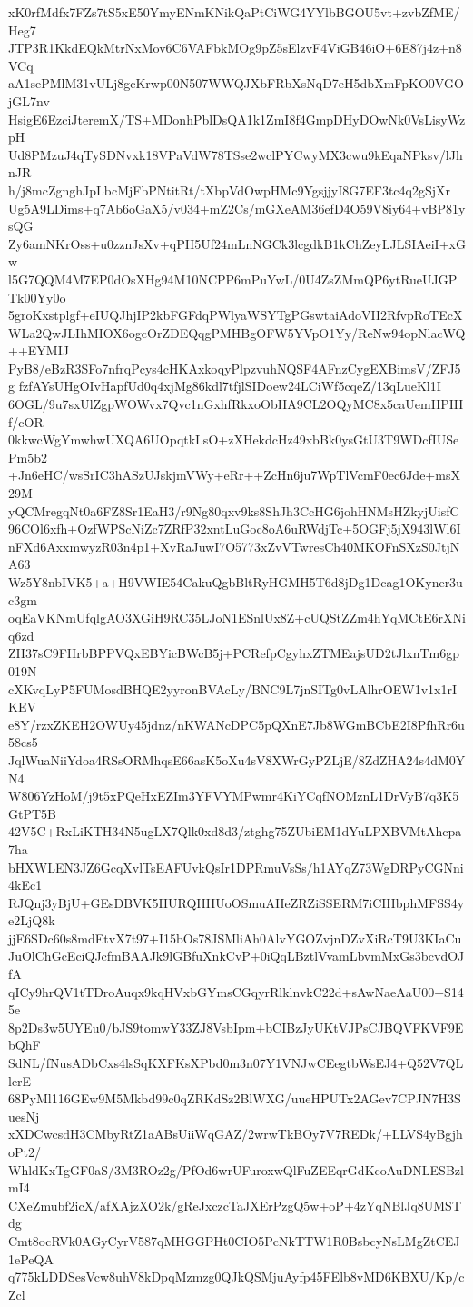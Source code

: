 xK0rfMdfx7FZs7tS5xE50YmyENmKNikQaPtCiWG4YYlbBGOU5vt+zvbZfME/Heg7
JTP3R1KkdEQkMtrNxMov6C6VAFbkMOg9pZ5sElzvF4ViGB46iO+6E87j4z+n8VCq
aA1sePMlM31vULj8gcKrwp00N507WWQJXbFRbXsNqD7eH5dbXmFpKO0VGOjGL7nv
HsigE6EzciJteremX/TS+MDonhPblDsQA1k1ZmI8f4GmpDHyDOwNk0VsLisyWzpH
Ud8PMzuJ4qTySDNvxk18VPaVdW78TSse2wclPYCwyMX3cwu9kEqaNPksv/lJhnJR
h/j8mcZgnghJpLbcMjFbPNtitRt/tXbpVdOwpHMc9YgsjjyI8G7EF3tc4q2gSjXr
Ug5A9LDims+q7Ab6oGaX5/v034+mZ2Cs/mGXeAM36efD4O59V8iy64+vBP81ysQG
Zy6amNKrOss+u0zznJsXv+qPH5Uf24mLnNGCk3lcgdkB1kChZeyLJLSIAeiI+xGw
l5G7QQM4M7EP0dOsXHg94M10NCPP6mPuYwL/0U4ZsZMmQP6ytRueUJGPTk00Yy0o
5groKxstplgf+eIUQJhjIP2kbFGFdqPWlyaWSYTgPGswtaiAdoVII2RfvpRoTEcX
WLa2QwJLIhMIOX6ogcOrZDEQqgPMHBgOFW5YVpO1Yy/ReNw94opNlacWQ++EYMIJ
PyB8/eBzR3SFo7nfrqPcys4cHKAxkoqyPlpzvuhNQSF4AFnzCygEXBimsV/ZFJ5g
fzfAYsUHgOIvHapfUd0q4xjMg86kdl7tfjlSIDoew24LCiWf5cqeZ/13qLueKl1I
6OGL/9u7sxUlZgpWOWvx7Qvc1nGxhfRkxoObHA9CL2OQyMC8x5caUemHPIHf/cOR
0kkwcWgYmwhwUXQA6UOpqtkLsO+zXHekdcHz49xbBk0ysGtU3T9WDcfIUSePm5b2
+Jn6eHC/wsSrIC3hASzUJskjmVWy+eRr++ZcHn6ju7WpTlVcmF0ec6Jde+msX29M
yQCMregqNt0a6FZ8Sr1EaH3/r9Ng80qxv9ks8ShJh3CcHG6johHNMsHZkyjUisfC
96COl6xfh+OzfWPScNiZc7ZRfP32xntLuGoc8oA6uRWdjTc+5OGFj5jX943lWl6I
nFXd6AxxmwyzR03n4p1+XvRaJuwI7O5773xZvVTwresCh40MKOFnSXzS0JtjNA63
Wz5Y8nbIVK5+a+H9VWIE54CakuQgbBltRyHGMH5T6d8jDg1Dcag1OKyner3uc3gm
oqEaVKNmUfqlgAO3XGiH9RC35LJoN1ESnlUx8Z+cUQStZZm4hYqMCtE6rXNiq6zd
ZH37sC9FHrbBPPVQxEBYicBWcB5j+PCRefpCgyhxZTMEajsUD2tJlxnTm6gp019N
cXKvqLyP5FUMosdBHQE2yyronBVAcLy/BNC9L7jnSITg0vLAlhrOEW1v1x1rIKEV
e8Y/rzxZKEH2OWUy45jdnz/nKWANcDPC5pQXnE7Jb8WGmBCbE2I8PfhRr6u58cs5
JqlWuaNiiYdoa4RSsORMhqsE66asK5oXu4sV8XWrGyPZLjE/8ZdZHA24s4dM0YN4
W806YzHoM/j9t5xPQeHxEZIm3YFVYMPwmr4KiYCqfNOMznL1DrVyB7q3K5GtPT5B
42V5C+RxLiKTH34N5ugLX7Qlk0xd8d3/ztghg75ZUbiEM1dYuLPXBVMtAhcpa7ha
bHXWLEN3JZ6GcqXvlTsEAFUvkQsIr1DPRmuVsSs/h1AYqZ73WgDRPyCGNni4kEc1
RJQnj3yBjU+GEsDBVK5HURQHHUoOSmuAHeZRZiSSERM7iCIHbphMFSS4ye2LjQ8k
jjE6SDc60s8mdEtvX7t97+I15bOs78JSMliAh0AlvYGOZvjnDZvXiRcT9U3KIaCu
JuOlChGcEciQJcfmBAAJk9lGBfuXnkCvP+0iQqLBztlVvamLbvmMxGs3bcvdOJfA
qICy9hrQV1tTDroAuqx9kqHVxbGYmsCGqyrRlklnvkC22d+sAwNaeAaU00+S145e
8p2Ds3w5UYEu0/bJS9tomwY33ZJ8VsbIpm+bCIBzJyUKtVJPsCJBQVFKVF9EbQhF
SdNL/fNusADbCxs4lsSqKXFKsXPbd0m3n07Y1VNJwCEegtbWsEJ4+Q52V7QLlerE
68PyMl116GEw9M5Mkbd99c0qZRKdSz2BlWXG/uueHPUTx2AGev7CPJN7H3SuesNj
xXDCwcsdH3CMbyRtZ1aABsUiiWqGAZ/2wrwTkBOy7V7REDk/+LLVS4yBgjhoPt2/
WhldKxTgGF0aS/3M3ROz2g/PfOd6wrUFuroxwQlFuZEEqrGdKcoAuDNLESBzlmI4
CXeZmubf2icX/afXAjzXO2k/gReJxczcTaJXErPzgQ5w+oP+4zYqNBlJq8UMSTdg
Cmt8ocRVk0AGyCyrV587qMHGGPHt0CIO5PcNkTTW1R0BsbcyNsLMgZtCEJ1ePeQA
q775kLDDSesVcw8uhV8kDpqMzmzg0QJkQSMjuAyfp45FElb8vMD6KBXU/Kp/cZcl
